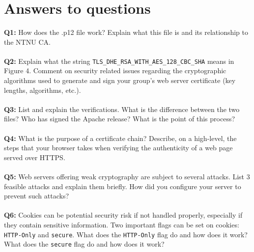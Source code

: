 \section{Answers to questions}

\paragraph{}
\textbf{Q1:}
How does the .p12 file work? Explain what this file is and its relationship to the NTNU CA.

\paragraph{}
\textbf{Q2:}
Explain what the string \verb/TLS_DHE_RSA_WITH_AES_128_CBC_SHA/ means in Figure 4. Comment on security related issues regarding the cryptographic algorithms used to generate and sign your group's web server certificate (key lengths, algorithms, etc.).

\paragraph{}
\textbf{Q3:}
List and explain the verifications. What is the difference between the two files? Who has signed the Apache release? What is the point of this process?

\paragraph{}
\textbf{Q4:}
What is the purpose of a certificate chain? Describe, on a high-level, the steps that your browser takes when verifying the authenticity of a web page served over HTTPS.

\paragraph{}
\textbf{Q5:}
Web servers offering weak cryptography are subject to several attacks. List 3 feasible attacks and explain them briefly. How did you configure your server to prevent such attacks?

\paragraph{}
\textbf{Q6:}
Cookies can be potential security risk if not handled properly, especially if they contain sensitive information. Two important flags can be set on cookies: \verb/HTTP-Only/ and \verb/secure/. What does the \verb/HTTP-Only/ flag do and how does it work? What does the \verb/secure/ flag do and how does it work?


